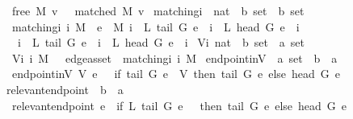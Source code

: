 \begin{isabellebody}
\ \ {\isachardoublequoteopen}free\ M\ v\ {\isasymequiv}\ {\isasymnot}\ matched\ M\ v{\isachardoublequoteclose}\isanewline
\isanewline
\isanewline
{}\isamarkupfalse%
\ matching{\isacharunderscore}i\ {\isacharcolon}{\isacharcolon}\ {\isachardoublequoteopen}nat\ {\isasymRightarrow}\ {\isacharprime}b\ set\ {\isasymRightarrow}\ {\isacharprime}b\ set{\isachardoublequoteclose}\ \isanewline
\ \ {\isachardoublequoteopen}matching{\isacharunderscore}i\ i\ M\ {\isasymequiv}\ {\isacharbraceleft}e\ {\isasymin}\ M{\isachardot}\ i{\isacharequal}{}\ {\isasymand}\ {\isacharparenleft}L\ {\isacharparenleft}tail\ G\ e{\isacharparenright}\ {\isacharequal}\ i\ {\isasymor}\ L\ {\isacharparenleft}head\ G\ e{\isacharparenright}\ {\isacharequal}\ i{\isacharparenright}\ \isanewline
\ \ {\isasymor}\ i{\isachargreater}{}\ {\isasymand}\ L\ {\isacharparenleft}tail\ G\ e{\isacharparenright}\ {\isacharequal}\ i\ {\isasymand}\ L\ {\isacharparenleft}head\ G\ e{\isacharparenright}\ {\isacharequal}\ i{\isacharbraceright}{\isachardoublequoteclose}\isanewline
\isanewline
{}\isamarkupfalse%
\ V{\isacharunderscore}i{\isacharcolon}{\isacharcolon}\ {\isachardoublequoteopen}nat\ {\isasymRightarrow}\ {\isacharprime}b\ set\ {\isasymRightarrow}\ {\isacharprime}a\ set{\isachardoublequoteclose}\ \isanewline
\ \ {\isachardoublequoteopen}V{\isacharunderscore}i\ i\ M\ {\isasymequiv}\ {\isasymUnion}\ {\isacharparenleft}edge{\isacharunderscore}as{\isacharunderscore}set\ {\isacharbackquote}\ matching{\isacharunderscore}i\ i\ M{\isacharparenright}{\isachardoublequoteclose}\isanewline
\isanewline
{}\isamarkupfalse%
\ endpoint{\isacharunderscore}inV\ {\isacharcolon}{\isacharcolon}\ {\isachardoublequoteopen}{\isacharprime}a\ set\ {\isasymRightarrow}\ {\isacharprime}b\ {\isasymRightarrow}\ {\isacharprime}a{\isachardoublequoteclose}\ \ \isanewline
\ \ {\isachardoublequoteopen}endpoint{\isacharunderscore}inV\ V\ e\ {\isasymequiv}\ \ if\ tail\ G\ e\ {\isasymin}\ V\ then\ tail\ G\ e\ else\ head\ G\ e{\isachardoublequoteclose}\ \isanewline
\isanewline
{}\isamarkupfalse%
\ relevant{\isacharunderscore}endpoint\ {\isacharcolon}{\isacharcolon}\ {\isachardoublequoteopen}{\isacharprime}b\ {\isasymRightarrow}\ {\isacharprime}a{\isachardoublequoteclose}\ \ \isanewline
\ \ {\isachardoublequoteopen}relevant{\isacharunderscore}endpoint\ e\ {\isasymequiv}\ if\ L\ {\isacharparenleft}tail\ G\ e{\isacharparenright}\ {\isacharequal}\ {}\ then\ tail\ G\ e\ else\ head\ G\ e{\isachardoublequoteclose}\isanewline

\end{isabellebody}
